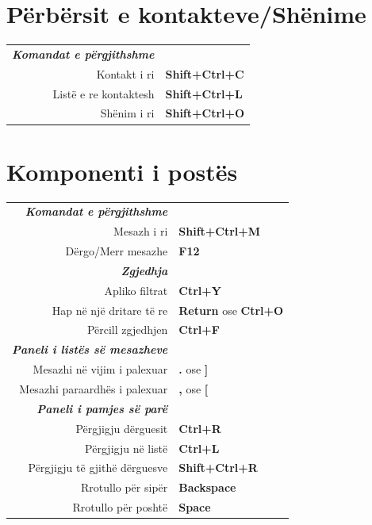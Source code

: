 \documentclass[12pt]{article}
\begin{document}
\begin{landscape}
\begin{center}
\begin{multicols}{2}
	\section*{Përbërsit e kontakteve/Shënime}
	\begin{tabular*}{4in}{rp{1.5in}}
		\textit{\textbf{Komandat e përgjithshme}}	&					\\
		Kontakt i ri				& \textbf{Shift+Ctrl+C}			\\
		Listë e re kontaktesh			& \textbf{Shift+Ctrl+L}			\\
		Shënim i ri				& \textbf{Shift+Ctrl+O}			\\
	\end{tabular*}
	\section*{Komponenti i postës}
	\begin{tabular*}{4in}{rp{1.5in}}
		\textit{\textbf{Komandat e përgjithshme}}	&					\\
		Mesazh i ri				& \textbf{Shift+Ctrl+M}			\\
		\vspace{1.5mm}
		Dërgo/Merr mesazhe			& \textbf{F12}				\\
		\textit{\textbf{Zgjedhja}}		&					\\
		Apliko filtrat				& \textbf{Ctrl+Y}			\\
		Hap në një dritare të re 			& \textbf{Return} ose \textbf{Ctrl+O}	\\
		\vspace{1.5mm}
		Përcill zgjedhjen			& \textbf{Ctrl+F}			\\
		\textit{\textbf{Paneli i listës së mesazheve}}	&					\\
		Mesazhi në vijim i palexuar			& \textbf{.} ose \textbf{]}		\\
		\vspace{1.5mm}
		Mesazhi paraardhës i palexuar			& \textbf{,} ose \textbf{[}		\\
		\textit{\textbf{Paneli i pamjes së parë}}		&					\\
		Përgjigju dërguesit				& \textbf{Ctrl+R}			\\
		Përgjigju në listë				& \textbf{Ctrl+L}			\\
		Përgjigju të gjithë dërguesve 		& \textbf{Shift+Ctrl+R}			\\
		Rrotullo për sipër				& \textbf{Backspace}			\\
		Rrotullo për poshtë				& \textbf{Space}			\\
	\end{tabular*}

\end{multicols}
\end{center}
\end{landscape}
\end{document}
